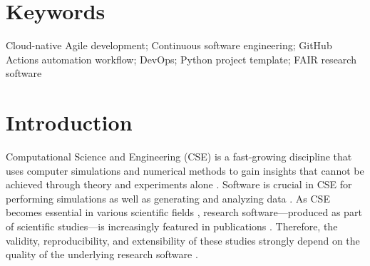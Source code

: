 \documentclass{article}
\begin{document}
\section*{Keywords}

Cloud-native Agile development; Continuous software engineering; GitHub Actions automation workflow; DevOps; Python project template; FAIR research software

\clearpage
{}
\setcounter{page}{1}

\section{Introduction}

Computational Science and Engineering (CSE) is a fast-growing discipline that uses computer simulations and numerical methods to gain insights that cannot be achieved through theory and experiments alone \cite{CSE, CSE2, EssenceOfCompSci, Bramley2000}. Software is crucial in CSE for performing simulations as well as generating and analyzing data \cite{RolesOfCodeInCSE, DevelopingSciSoft}. As CSE becomes essential in various scientific fields \cite{ResearchAndEdInCSE}, research software—produced as part of scientific studies—is increasingly featured in publications \cite{UKResearchSoftwareSurvey2014}. Therefore, the validity, reproducibility, and extensibility of these studies strongly depend on the quality of the underlying research software \cite{CompSciDemandsNewParagdim}. 
\end{document}
